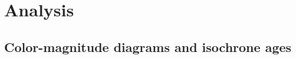 \documentclass[modern,letterpaper]{aastex61}
\newcommand{\figname}{Figure}
\newcommand{\bs}[1]{\boldsymbol{#1}}
\renewcommand{\vec}[1]{\bs{#1}}
\newcommand{\kms}{\ensuremath{\rm km~s^{-1}}}
\newcommand{\todo}[1]{{\color{crimson}#1}}
\newcommand{\meanVelocityOpt}{\ensuremath{(u_x,\,u_y,\,u_z) = (-3.9,\,7.0,\,-3.8)~\kms}}
\newcommand{\sigVelocityOpt}{\ensuremath{0.42~\kms}}
\begin{document}
%
%
%
%
%
%

\section{Analysis}

\subsection{Color-magnitude diagrams and isochrone ages}
\end{document}
